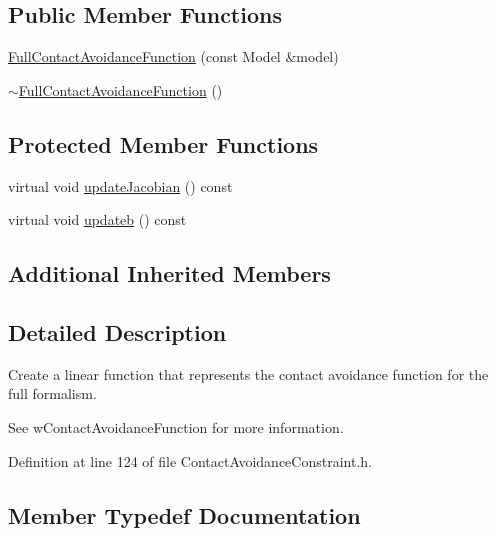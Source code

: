 \subsection*{Public Member Functions}
\begin{DoxyCompactItemize}
\item 
\hyperlink{classocra_1_1FullContactAvoidanceFunction_aa1632bec7158003ab2da17f71aa134e0}{Full\+Contact\+Avoidance\+Function} (const Model \&model)
\item 
\hyperlink{classocra_1_1FullContactAvoidanceFunction_abf414a050f3b16c4a095049937335c96}{$\sim$\+Full\+Contact\+Avoidance\+Function} ()
\end{DoxyCompactItemize}
\subsection*{Protected Member Functions}
\begin{DoxyCompactItemize}
\item 
virtual void \hyperlink{classocra_1_1FullContactAvoidanceFunction_a91b21004faed7ffa6a51e975abc93797}{update\+Jacobian} () const
\item 
virtual void \hyperlink{classocra_1_1FullContactAvoidanceFunction_ae24690ecd464eefd43936907e33c4cb9}{updateb} () const
\end{DoxyCompactItemize}
\subsection*{Additional Inherited Members}


\subsection{Detailed Description}
Create a linear function that represents the contact avoidance function for the full formalism. 

See w\+Contact\+Avoidance\+Function for more information. 

Definition at line 124 of file Contact\+Avoidance\+Constraint.\+h.



\subsection{Member Typedef Documentation}
\hypertarget{classocra_1_1FullContactAvoidanceFunction_a9b59cb139be82095188084893d70b996}{}\label{classocra_1_1FullContactAvoidanceFunction_a9b59cb139be82095188084893d70b996} 
